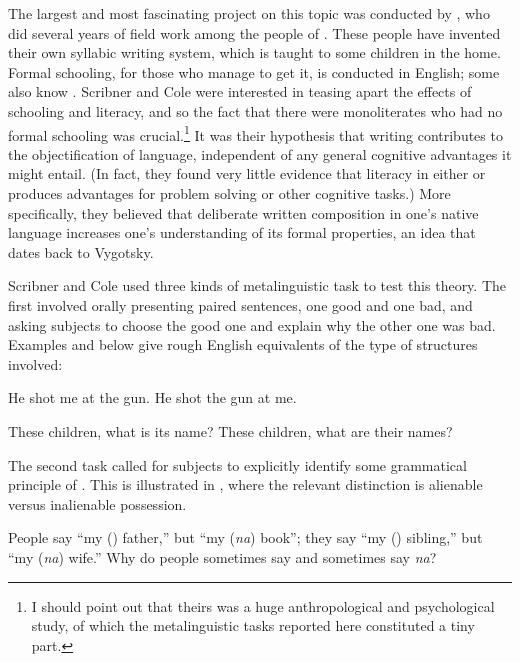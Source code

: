 The largest and most fascinating project on this topic was conducted by \citet{ScribnerEtAl1981}, who did several years of field work among the  people of . These people have invented their own syllabic writing system, which is taught to some children in the home. Formal schooling, for those who manage to get it, is conducted in English; some  also know . Scribner and Cole were interested in teasing apart the effects of schooling and literacy, and so the fact that there were  monoliterates who had no formal schooling was crucial.\footnote{ I should point out that theirs was a huge anthropological and psychological study, of which the metalinguistic tasks reported here constituted a tiny part.}
 It was their hypothesis that writing contributes to the objectification of language, independent of any general cognitive advantages it might entail. (In fact, they found very little evidence that literacy in either  or  produces advantages for problem solving or other cognitive tasks.) More specifically, they believed that deliberate written composition in one's native language increases one's understanding of its formal properties, an idea that dates back to Vygotsky.
 
 Scribner and Cole used three kinds of metalinguistic task to test this theory. The first involved orally presenting paired sentences, one good and one bad, and asking subjects to choose the good one and explain why the other one was bad.
Examples  and  below give rough English equivalents of the type of structures involved:

\ea\label{ex:4:5}
\ea He shot me at the gun.
\ex  He shot the gun at me.
\z
\z


\ea\label{ex:4:6}
\ea These children, what is its name? 
\ex These children, what are their names?
\z
\z

\noindent
The second task called for subjects to explicitly identify some grammatical principle of . This is illustrated in , where the relevant distinction is alienable versus inalienable possession.

\ea%
    \label{ex:4:7}
    
	  People say ``my (\textit{{\ng}}) father,'' but ``my (\textit{na}) book''; they say ``my (\textit{{\ng}}) sibling,'' but ``my (\textit{na}) wife.'' Why do people sometimes say \textit{{\ng}} and sometimes say \textit{na}?
    


